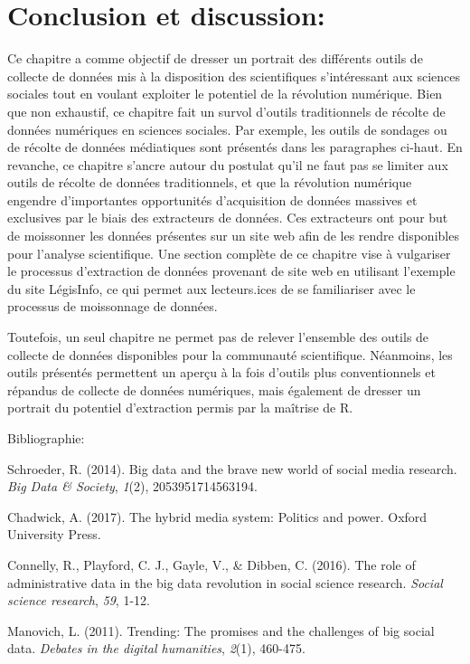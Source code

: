 \documentclass[
  letterpaper,
  DIV=11,
  numbers=noendperiod]{scrreprt}
\begin{document}
\hfill\break

\hypertarget{conclusion-et-discussion}{%
\section{Conclusion et discussion:}\label{conclusion-et-discussion}}

Ce chapitre a comme objectif de dresser un portrait des différents
outils de collecte de données mis à la disposition des scientifiques
s'intéressant aux sciences sociales tout en voulant exploiter le
potentiel de la révolution numérique. Bien que non exhaustif, ce
chapitre fait un survol d'outils traditionnels de récolte de données
numériques en sciences sociales. Par exemple, les outils de sondages ou
de récolte de données médiatiques sont présentés dans les paragraphes
ci-haut. En revanche, ce chapitre s'ancre autour du postulat qu'il ne
faut pas se limiter aux outils de récolte de données traditionnels, et
que la révolution numérique engendre d'importantes opportunités
d'acquisition de données massives et exclusives par le biais des
extracteurs de données. Ces extracteurs ont pour but de moissonner les
données présentes sur un site web afin de les rendre disponibles pour
l'analyse scientifique. Une section complète de ce chapitre vise à
vulgariser le processus d'extraction de données provenant de site web en
utilisant l'exemple du site LégisInfo, ce qui permet aux lecteurs.ices
de se familiariser avec le processus de moissonnage de données.

Toutefois, un seul chapitre ne permet pas de relever l'ensemble des
outils de collecte de données disponibles pour la communauté
scientifique. Néanmoins, les outils présentés permettent un aperçu à la
fois d'outils plus conventionnels et répandus de collecte de données
numériques, mais également de dresser un portrait du potentiel
d'extraction permis par la maîtrise de R.

Bibliographie:

Schroeder, R. (2014). Big data and the brave new world of social media
research. \emph{Big Data \& Society}, \emph{1}(2), 2053951714563194.

Chadwick, A. (2017). The hybrid media system: Politics and power. Oxford
University Press.

Connelly, R., Playford, C. J., Gayle, V., \& Dibben, C. (2016). The role
of administrative data in the big data revolution in social science
research. \emph{Social science research}, \emph{59}, 1-12.

Manovich, L. (2011). Trending: The promises and the challenges of big
social data. \emph{Debates in the digital humanities}, \emph{2}(1),
460-475.
\end{document}
